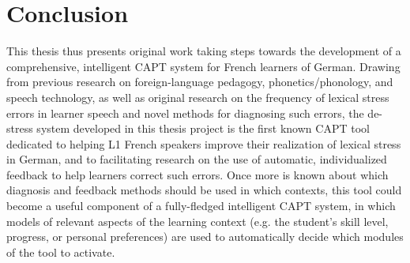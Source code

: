 \documentclass[11pt,a4paper,onecolumn]{article}
\newcommand{\TODO}[1]{{\color{red}\textbf{[TODO #1]}}}
\begin{document}
\section{Conclusion}

This thesis thus presents original work taking steps towards the development of a comprehensive, intelligent CAPT system for French learners of German. Drawing from previous research on foreign-language pedagogy, phonetics/phonology, and speech technology, as well as original research on the frequency of lexical stress errors in learner speech and novel methods for diagnosing such errors, the de-stress system developed in this thesis project is the first known CAPT tool dedicated to helping L1 French speakers improve their realization of lexical stress in German, and to facilitating research on the use of automatic, individualized feedback to help learners correct such errors. 
Once more is known about which diagnosis and feedback methods should be used in which contexts, this tool could become a useful component of a fully-fledged intelligent CAPT system, in which
models of relevant aspects of the learning context (e.g. the student's skill level, progress, or personal preferences)
are used to automatically decide which modules of the tool to activate. %



\clearpage



\end{document}

